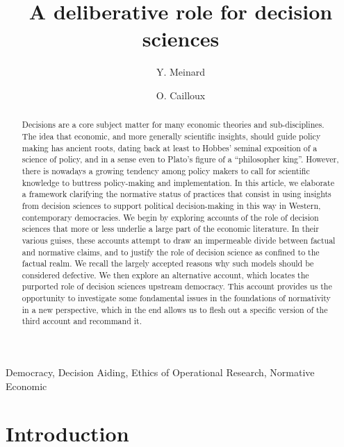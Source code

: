 \documentclass[preprint, french, english, 11pt]{elsarticle}%
\begin{document}
\title{A deliberative role for decision sciences}
\author[ld]{Y. Meinard}
\author[ld]{O. Cailloux}
\address[ld]{Universit\'e Paris-Dauphine, PSL Research University, CNRS, UMR [7243], LAMSADE, 75016 PARIS, FRANCE}

\begin{abstract}
Decisions are a core subject matter for many economic theories and sub-disciplines. The idea that economic, and more generally scientific insights, should guide policy making has ancient roots, dating back at least to Hobbes’ seminal exposition of a science of policy, and in a sense even to Plato's figure of a ``philosopher king''. However, there is nowadays a growing tendency among policy makers to call for scientific knowledge to buttress policy-making and implementation. In this article, we elaborate a framework clarifying the normative status of practices that consist in using insights from decision sciences to support political decision-making in this way in Western, contemporary democracies. We begin by exploring accounts of the role of decision sciences that more or less underlie a large part of the economic literature. In their various guises, these accounts attempt to draw an impermeable divide between factual and normative claims, and to justify the role of decision science as confined to the factual realm. We recall the largely accepted reasons why such models should be considered defective. We then explore an alternative account, which locates the purported role of decision sciences upstream democracy. This account provides us the opportunity to investigate some fondamental issues in the foundations of normativity in a new perspective, which in the end allows us to flesh out a specific version of the third account and recommand it.
\end{abstract}

\begin{keyword}
Democracy, Decision Aiding, Ethics of Operational Research, Normative Economic
\end{keyword}

\maketitle

\section{Introduction}
\end{document}
